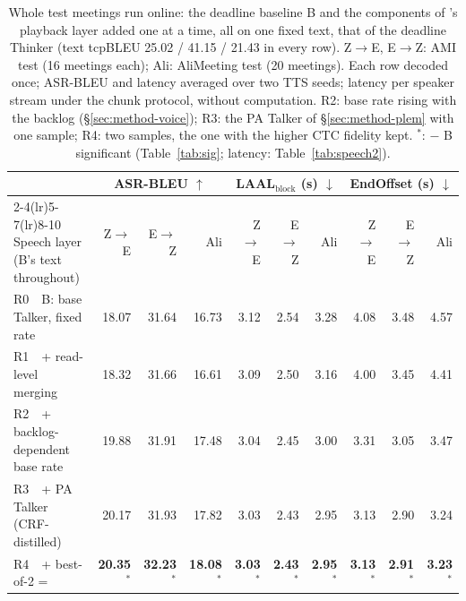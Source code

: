 \begin{table}[t]
\centering\small
\setlength{\tabcolsep}{4pt}
\begin{tabular}{lrrrrrrrrr}
\toprule
 & \multicolumn{3}{c}{ASR-BLEU $\uparrow$} & \multicolumn{3}{c}{LAAL$_\text{block}$ (s) $\downarrow$} & \multicolumn{3}{c}{EndOffset (s) $\downarrow$} \\
\cmidrule(lr){2-4}\cmidrule(lr){5-7}\cmidrule(lr){8-10}
Speech layer (B's text throughout) & Z$\rightarrow$E & E$\rightarrow$Z & Ali & Z$\rightarrow$E & E$\rightarrow$Z & Ali & Z$\rightarrow$E & E$\rightarrow$Z & Ali \\
\midrule
R0\ \ B: base Talker, fixed rate & 18.07 & 31.64 & 16.73 & 3.12 & 2.54 & 3.28 & 4.08 & 3.48 & 4.57 \\
R1\ \ + read-level merging & 18.32 & 31.66 & 16.61 & 3.09 & 2.50 & 3.16 & 4.00 & 3.45 & 4.41 \\
R2\ \ + backlog-dependent base rate & 19.88 & 31.91 & 17.48 & 3.04 & 2.45 & 3.00 & 3.31 & 3.05 & 3.47 \\
R3\ \ + PA Talker (CRF-distilled) & 20.17 & 31.93 & 17.82 & 3.03 & 2.43 & 2.95 & 3.13 & 2.90 & 3.24 \\
\midrule
R4\ \ + best-of-2 = \sys{} & \textbf{20.35}$^{*}$ & \textbf{32.23}$^{*}$ & \textbf{18.08}$^{*}$ & \textbf{3.03}$^{*}$ & \textbf{2.43}$^{*}$ & \textbf{2.95}$^{*}$ & \textbf{3.13}$^{*}$ & \textbf{2.91}$^{*}$ & \textbf{3.23}$^{*}$ \\
\bottomrule
\end{tabular}
\caption{Whole test meetings run online: the deadline baseline B and the components of \sys{}'s playback layer added one at a time, all on one fixed text, that of the deadline Thinker (text tcpBLEU 25.02 / 41.15 / 21.43 in every row). Z$\rightarrow$E, E$\rightarrow$Z: AMI test (16 meetings each); Ali: AliMeeting test (20 meetings). Each row decoded once; ASR-BLEU and latency averaged over two TTS seeds; latency per speaker stream under the chunk protocol, without computation. R2: base rate rising with the backlog (\S\ref{sec:method-voice}); R3: the PA Talker of \S\ref{sec:method-plem} with one sample; R4: two samples, the one with the higher CTC fidelity kept. $^{*}$: \sys{} $-$ B significant (Table~\ref{tab:sig}; latency: Table~\ref{tab:speech2}).}
\label{tab:main}
\end{table}

